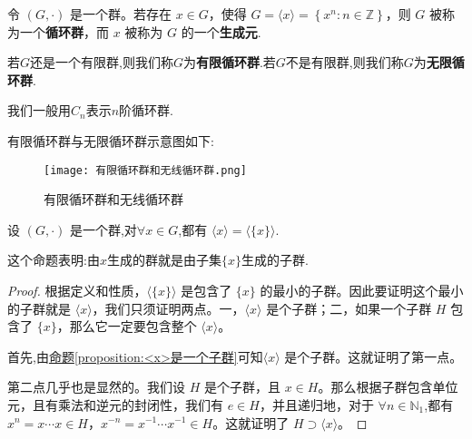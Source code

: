 \documentclass[../../main.tex]{subfiles}
\begin{document}
\begin{definition}[循环群]
令 $(G,\cdot)$ 是一个群。若存在 $x\in G$，使得 $G = \langle x\rangle=\left\{ x^n:n\in \mathbb{Z} \right\} $，则 $G$ 被称为一个\textbf{循环群}，而 $x$ 被称为 $G$ 的一个\textbf{生成元}.

若$G$还是一个有限群,则我们称$G$为\textbf{有限循环群}.若$G$不是有限群,则我们称$G$为\textbf{无限循环群}.
\end{definition}
\begin{remark}
我们一般用$C_n$表示$n$阶循环群.
\end{remark}
\begin{note}
有限循环群与无限循环群示意图如下:
\begin{figure}[H]
\centering
\texttt{[image: 有限循环群和无线循环群.png]}
\label{figure:有限循环群和无线循环群}
\caption{有限循环群和无线循环群}
\end{figure}
\end{note}

\begin{proposition}\label{proposition:由x生成的群就是由子集{x}生成的子群}
设 $(G,\cdot)$ 是一个群,对$\forall x\in G$,都有 $\langle x\rangle=\langle\{x\}\rangle$.
\end{proposition}
\begin{note}
这个命题表明:由$x$生成的群就是由子集$\{x\}$生成的子群.
\end{note}
\begin{proof}
根据定义和性质，$\langle\{x\}\rangle$ 是包含了 $\{x\}$ 的最小的子群。因此要证明这个最小的子群就是 $\langle x\rangle$，我们只须证明两点。一，$\langle x\rangle$ 是个子群；二，如果一个子群 $H$ 包含了 $\{x\}$，那么它一定要包含整个 $\langle x\rangle$。

首先,由\hyperref[proposition:<x>是一个子群]{命题\ref{proposition:<x>是一个子群}}可知$\langle x\rangle$ 是个子群。这就证明了第一点。

第二点几乎也是显然的。我们设 $H$ 是个子群，且 $x\in H$。那么根据子群包含单位元，且有乘法和逆元的封闭性，我们有 $e\in H$，并且递归地，对于 $\forall n\in\mathbb{N}_1$,都有$x^n = x\cdots x\in H$，$x^{-n}=x^{-1}\cdots x^{-1}\in H$。这就证明了 $H\supset\langle x\rangle$。 

\end{proof}
\end{document}
